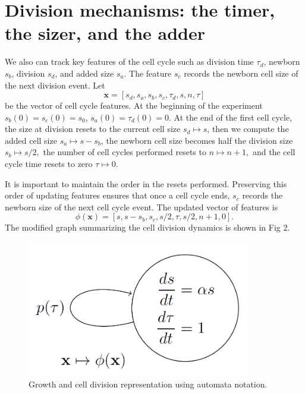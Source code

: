 \documentclass[
  letterpaper,
  DIV=11,
  numbers=noendperiod]{scrreprt}
\begin{document}
\hypertarget{division-mechanisms-the-timer-the-sizer-and-the-adder}{%
\section{Division mechanisms: the timer, the sizer, and the
adder}\label{division-mechanisms-the-timer-the-sizer-and-the-adder}}

We also can track key features of the cell cycle such as division time
\(\tau_d\), newborn \(s_b\), division \(s_d\), and added size \(s_a\).
The feature \(s_c\) records the newborn cell size of the next division
event. Let \[\mathbf{x}=[s_d,s_a,s_b,s_c,\tau_d, s, n, \tau]\] be the
vector of cell cycle features. At the beginning of the experiment
\(s_b(0)=s_c(0)=s_0\), \(s_a(0)=\tau_d(0)=0\). At the end of the first
cell cycle, the size at division resets to the current cell size
\(s_d \mapsto s\), then we compute the added cell size
\(s_a\mapsto s-s_b\), the newborn cell size becomes half the division
size \(s_b \mapsto s/2,\) the number of cell cycles performed resets to
\(n\mapsto n+1,\) and the cell cycle time resets to zero
\(\tau \mapsto 0.\)

It is important to maintain the order in the resets performed.
Preserving this order of updating features ensures that once a cell
cycle ends, \(s_c\) records the newborn size of the next cell cycle
event. The updated vector of features is
\[\phi(\mathbf{x})=[s,s-s_b,s_c,s/2,\tau,s/2,n+1,0].\] The modified
graph summarizing the cell division dynamics is shown in Fig 2.

\begin{figure}

{\centering \includegraphics[width=3.83333in,height=\textheight]{./shsm.png}

}

\caption{Growth and cell division representation using automata
notation.}

\end{figure}
\end{document}
